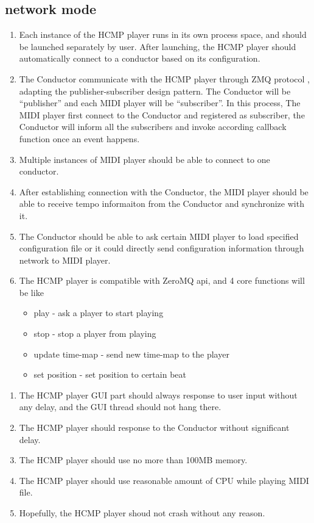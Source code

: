 \subsection{network mode}
\begin{enumerate}
  \item Each instance of the HCMP player runs in its own process space, and should 
        be launched separately by user.
        After launching, the HCMP player should automatically connect to a conductor 
        based on its configuration.
  \item The Conductor communicate with the HCMP player through ZMQ protocol 
        \cite{ZMQ}, adapting the publisher-subscriber design pattern. The 
        Conductor will be ``publisher'' and each MIDI player will be ``subscriber''. 
        In this process, The MIDI player first connect to the Conductor and 
        registered as subscriber, the Conductor will inform all the 
        subscribers and invoke according callback function once an event happens.
  \item Multiple instances of MIDI player should be able to connect to one conductor. 
  \item After establishing connection with the Conductor, the MIDI player 
        should be able to receive tempo informaiton from the Conductor and 
        synchronize with it.     
  \item The Conductor should be able to ask certain MIDI player to load specified configuration file or it could directly 
        send configuration information through network to MIDI player.
  \item 
    The HCMP player is compatible with ZeroMQ \cite{zeromq} api, and 4 core 
    functions will be like
    \begin{itemize}
      \item play - ask a player to start playing 
      \item stop - stop a player from playing 
      \item update time-map - send new time-map to the player 
      \item set position - set position to certain beat 
    \end{itemize}
\end{enumerate}

\begin{enumerate}
  \item The HCMP player GUI part should always response to user input without 
        any delay, and the GUI thread should not hang there.
  \item The HCMP player should response to the Conductor without significant delay.
  \item The HCMP player should use no more than 100MB memory.
  \item The HCMP player should use reasonable amount of CPU while playing MIDI file.
  \item Hopefully, the HCMP player shoud not crash without any reason. 
\end{enumerate}
